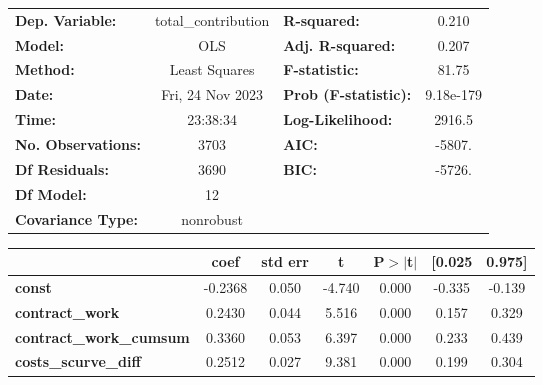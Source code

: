 \begin{center}
\begin{tabular}{lclc}
\toprule
\textbf{Dep. Variable:}                   & total\_contribution & \textbf{  R-squared:         } &     0.210   \\
\textbf{Model:}                           &         OLS         & \textbf{  Adj. R-squared:    } &     0.207   \\
\textbf{Method:}                          &    Least Squares    & \textbf{  F-statistic:       } &     81.75   \\
\textbf{Date:}                            &   Fri, 24 Nov 2023  & \textbf{  Prob (F-statistic):} & 9.18e-179   \\
\textbf{Time:}                            &       23:38:34      & \textbf{  Log-Likelihood:    } &    2916.5   \\
\textbf{No. Observations:}                &          3703       & \textbf{  AIC:               } &    -5807.   \\
\textbf{Df Residuals:}                    &          3690       & \textbf{  BIC:               } &    -5726.   \\
\textbf{Df Model:}                        &            12       & \textbf{                     } &             \\
\textbf{Covariance Type:}                 &      nonrobust      & \textbf{                     } &             \\
\bottomrule
\end{tabular}
\begin{tabular}{lcccccc}
                                          & \textbf{coef} & \textbf{std err} & \textbf{t} & \textbf{P$> |$t$|$} & \textbf{[0.025} & \textbf{0.975]}  \\
\midrule
\textbf{const}                            &      -0.2368  &        0.050     &    -4.740  &         0.000        &       -0.335    &       -0.139     \\
\textbf{contract\_work}                   &       0.2430  &        0.044     &     5.516  &         0.000        &        0.157    &        0.329     \\
\textbf{contract\_work\_cumsum}           &       0.3360  &        0.053     &     6.397  &         0.000        &        0.233    &        0.439     \\
\textbf{costs\_scurve\_diff}              &       0.2512  &        0.027     &     9.381  &         0.000        &        0.199    &        0.304     \\

\end{tabular}
\end{center}
